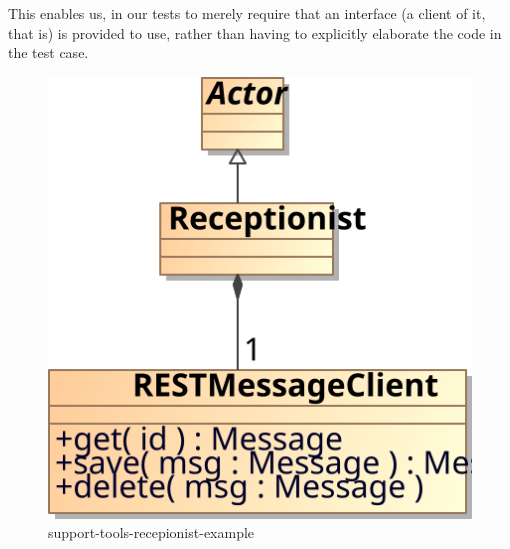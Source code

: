 
This enables us, in our tests to merely require that an interface (a client of it, that is) is provided to use, rather than having to explicitly elaborate the code in the test case.

\begin{figure}
 \centering
 \includegraphics[scale=0.60]{img/support-tools-recepionist-example}
 \caption{support-tools-recepionist-example}
 \label{fig:support-tools-recepionist-example}
\end{figure}

